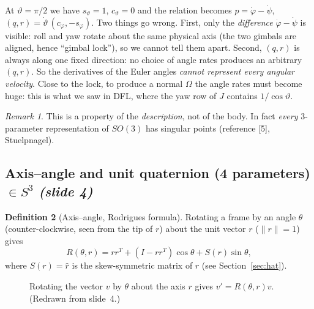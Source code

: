 \documentclass[11pt,a4paper]{article}
\newcommand{\hatm}[1]{\widehat{#1}}          %
\newcommand{\sli}[1]{\emph{(#1)}}
\theoremstyle{definition}
\newtheorem{definition}{Definition}[section]
\theoremstyle{plain}
\theoremstyle{remark}
\newtheorem{remark}[definition]{Remark}
\begin{document}
\begin{intuition}
At $\vartheta=\pi/2$ we have $s_\vartheta=1$, $c_\vartheta=0$ and the relation becomes
$p=\dot\varphi-\dot\psi$, $(q,r)=\dot\vartheta\,(c_\varphi,-s_\varphi)$.
Two things go wrong. First, only the \emph{difference} $\dot\varphi-\dot\psi$ is visible: roll and yaw rotate about the same physical axis (the two gimbals are aligned, hence ``gimbal lock''), so we cannot tell them apart. Second, $(q,r)$ is always along one fixed direction: no choice of angle rates produces an arbitrary $(q,r)$. So the derivatives of the Euler angles \emph{cannot represent every angular velocity}. Close to the lock, to produce a normal $\Omega$ the angle rates must become huge: this is what we saw in DFL, where the yaw row of $J$ contains $1/\cos\vartheta$.
\end{intuition}

\begin{remark}
This is a property of the \emph{description}, not of the body. In fact \emph{every} 3-parameter representation of $SO(3)$ has singular points (reference [5], Stuelpnagel).
\end{remark}

\subsection{Axis--angle and unit quaternion (4 parameters) $\in S^3$ \sli{slide 4}}

\begin{definition}[Axis--angle, Rodrigues formula]
Rotating a frame by an angle $\theta$ (counter-clockwise, seen from the tip of $r$) about the unit vector $r$ ($\|r\|=1$) gives
\[
R(\theta,r)=rr^T+(I-rr^T)\cos\theta+S(r)\sin\theta ,
\]
where $S(r)=\hatm{r}$ is the skew-symmetric matrix of $r$ (see Section~\ref{sec:hat}).
\end{definition}

\begin{figure}[h]
\centering
{}
\caption{Rotating the vector $v$ by $\theta$ about the axis $r$ gives $v'=R(\theta,r)v$. (Redrawn from slide~4.)}
\end{figure}
\end{document}
